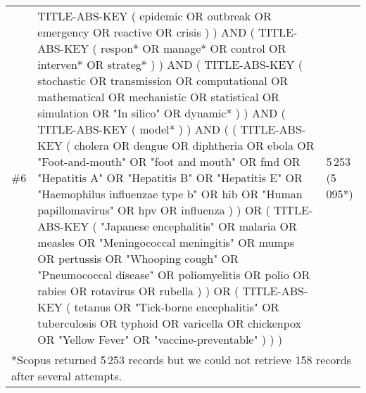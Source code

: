 \documentclass[10pt,a4paper]{article}
\begin{document}
\begin{sidewaysfigure}
\begin{table}[H]
\begin{tabular}{lp{}l}
			\#6 & TITLE-ABS-KEY ( epidemic  OR    outbreak  OR  emergency    OR  reactive  OR    crisis ) )  AND  ( TITLE-ABS-KEY ( respon*  OR    manage*  OR  control    OR  interven*  OR    strateg* ) )  AND   ( TITLE-ABS-KEY ( stochastic  OR    transmission  OR  computational  OR    mathematical  OR  mechanistic    OR  statistical  OR    simulation  OR  "In silico"  OR    dynamic* ) )  AND  ( TITLE-ABS-KEY ( model* ) )  AND    ( ( TITLE-ABS-KEY ( cholera    OR  dengue  OR    diphtheria  OR  ebola    OR    "Foot-and-mouth"    OR   "foot and   mouth"  OR  fmd    OR  "Hepatitis A"  OR    "Hepatitis B"  OR  "Hepatitis E"  OR    "Haemophilus influenzae type b"  OR    hib  OR  "Human papillomavirus"  OR    hpv  OR  influenza ) )  OR  (   TITLE-ABS-KEY ( "Japanese encephalitis"  OR    malaria  OR  measles    OR  "Meningococcal meningitis"  OR    mumps  OR  pertussis    OR  "Whooping   cough"  OR  "Pneumococcal disease"  OR    poliomyelitis  OR  polio    OR  rabies  OR    rotavirus  OR  rubella ) )    OR  ( TITLE-ABS-KEY ( tetanus  OR    "Tick-borne encephalitis"    OR  tuberculosis  OR    typhoid  OR  varicella     OR  chickenpox  OR    "Yellow Fever"    OR    "vaccine-preventable" ) ) ) & 5\,253 (5\, 095*) \\
			\multicolumn{3}{l}{*Scopus returned 5\,253 records but we could not retrieve 158 records after several attempts.}\\ \bottomrule
			\hline
		\end{tabular}
	\end{table}
\end{sidewaysfigure}	
\end{document}
